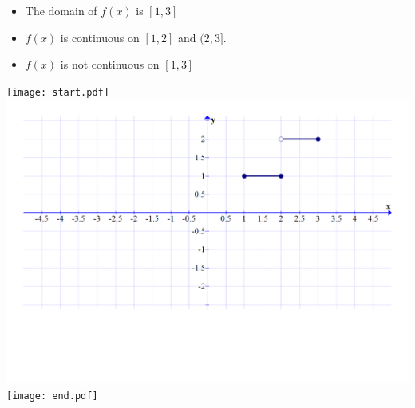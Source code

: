 \documentclass[12pt]{article}
\begin{document}
\begin{enumerate}
\begin{itemize}
\item The domain of $f(x)$ is $[1,3]$

\item $f(x)$ is continuous on $[1,2]$ and $(2,3]$.

\item $f(x)$ is not continuous on $[1,3]$

\end{itemize}

\texttt{[image: start.pdf]}
{{\includegraphics[scale=0.5]{graph1.pdf}}}
\texttt{[image: end.pdf]}


\end{enumerate}

\end{document}

